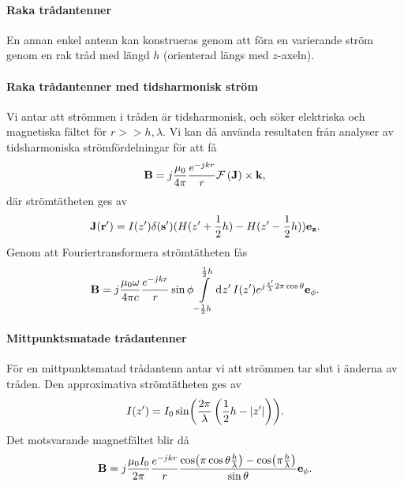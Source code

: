 \paragraph{Raka trådantenner}
En annan enkel antenn kan konstrueras genom att föra en varierande ström genom en rak tråd med längd $h$ (orienterad längs med $z$-axeln).

\paragraph{Raka trådantenner med tidsharmonisk ström}
Vi antar att strömmen i tråden är tidsharmonisk, och söker elektriska och magnetiska fältet för $r >> h, \lambda$. Vi kan då använda resultaten från analyser av tidsharmoniska strömfördelningar för att få
\begin{align*}
	\vb{B} = j\frac{\mu_{0}}{4\pi}\frac{e^{-jkr}}{r}\mathcal{F}\left(\vb{J}\right)\times\vb{k},
\end{align*}
där strömtätheten ges av
\begin{align*}
	\vb{J}(\vb{r}') = I(z')\delta(\vb{s}')(H(z' + \frac{1}{2}h) - H(z' - \frac{1}{2}h))\vb{e}_{\vb{z}}.
\end{align*}
Genom att Fouriertransformera strömtätheten fås
\begin{align*}
	\vb{B} = j\frac{\mu_{0}\omega}{4\pi c}\frac{e^{-jkr}}{r}\sin{\phi}\int\limits_{-\frac{1}{2}h}^{\frac{1}{2}h}\dd[]{z'}I(z')e^{j\frac{z'}{\lambda}2\pi\cos{\theta}}\vb{e}_{\vb{\phi}}.
\end{align*}

\paragraph{Mittpunktsmatade trådantenner}
För en mittpunktsmatad trådantenn antar vi att strömmen tar slut i änderna av tråden. Den approximativa strömtätheten ges av
\begin{align*}
	I(z') = I_{0}\sin(\frac{2\pi}{\lambda}\left(\frac{1}{2}h - \abs{z'}\right)).
\end{align*}
Det motsvarande magnetfältet blir då
\begin{align*}
	\vb{B} = j\frac{\mu_{0}I_{0}}{2\pi}\frac{e^{-jkr}}{r}\frac{\cos(\pi\cos{\theta}\frac{h}{\lambda}) - \cos(\pi\frac{h}{\lambda})}{\sin{\theta}}\vb{e}_{\vb{\phi}}.
\end{align*}

